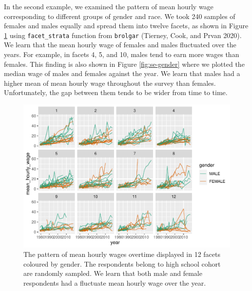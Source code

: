 \documentclass{article}
\begin{document}
In the second example, we examined the pattern of mean hourly wage corresponding to different groups of gender and race. We took 240 samples of females and males equally and spread them into twelve facets, as shown in Figure \ref{fig:plot-gender} using \texttt{facet\_strata} function from \texttt{brolgar} (Tierney, Cook, and Prvan 2020). We learn that the mean hourly wage of females and males fluctuated over the years. For example, in facets 4, 5, and 10, males tend to earn more wages than females. This finding is also shown in Figure \ref{fig:se-gender} where we plotted the median wage of males and females against the year. We learn that males had a higher mean of mean hourly wage throughout the survey than females. Unfortunately, the gap between them tends to be wider from time to time.

\begin{figure}
\centering
\includegraphics{figures/plot-gender-1.pdf}
\caption{\label{fig:plot-gender}The pattern of mean hourly wages overtime displayed in 12 facets coloured by gender. The respondents belong to high school cohort are randomly sampled. We learn that both male and female respondents had a fluctuate mean hourly wage over the year.}
\end{figure}
\end{document}
